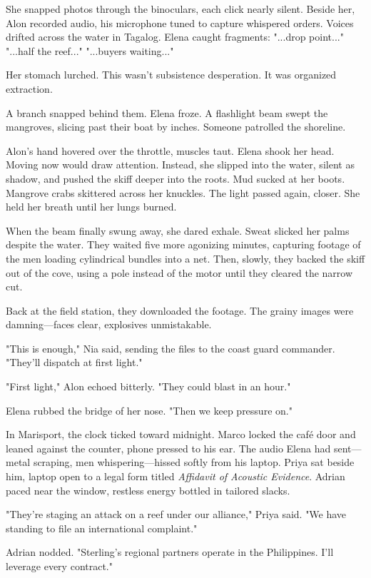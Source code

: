 She snapped photos through the binoculars, each click nearly silent. Beside her, Alon recorded audio, his microphone tuned to capture whispered orders. Voices drifted across the water in Tagalog. Elena caught fragments: "...drop point..." "...half the reef..." "...buyers waiting..."

Her stomach lurched. This wasn't subsistence desperation. It was organized extraction.

A branch snapped behind them. Elena froze. A flashlight beam swept the mangroves, slicing past their boat by inches. Someone patrolled the shoreline.

Alon's hand hovered over the throttle, muscles taut. Elena shook her head. Moving now would draw attention. Instead, she slipped into the water, silent as shadow, and pushed the skiff deeper into the roots. Mud sucked at her boots. Mangrove crabs skittered across her knuckles. The light passed again, closer. She held her breath until her lungs burned.

When the beam finally swung away, she dared exhale. Sweat slicked her palms despite the water. They waited five more agonizing minutes, capturing footage of the men loading cylindrical bundles into a net. Then, slowly, they backed the skiff out of the cove, using a pole instead of the motor until they cleared the narrow cut.

Back at the field station, they downloaded the footage. The grainy images were damning—faces clear, explosives unmistakable.

"This is enough," Nia said, sending the files to the coast guard commander. "They'll dispatch at first light."

"First light," Alon echoed bitterly. "They could blast in an hour."

Elena rubbed the bridge of her nose. "Then we keep pressure on."

\bigskip

In Marisport, the clock ticked toward midnight. Marco locked the café door and leaned against the counter, phone pressed to his ear. The audio Elena had sent—metal scraping, men whispering—hissed softly from his laptop. Priya sat beside him, laptop open to a legal form titled \textit{Affidavit of Acoustic Evidence}. Adrian paced near the window, restless energy bottled in tailored slacks.

"They're staging an attack on a reef under our alliance," Priya said. "We have standing to file an international complaint."

Adrian nodded. "Sterling's regional partners operate in the Philippines. I'll leverage every contract."

